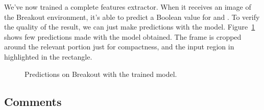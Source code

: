 We've now trained a complete features extractor. When it receives an image of
the Breakout environment, it's able to predict a Boolean value for
 and . To verify the quality of the result, we can
just make predictions with the model. Figure~\ref{fig:breakout-predict} shows
few predictions made with the model obtained. The frame is cropped around the
relevant portion just for compactness, and the input region in highlighted in
the rectangle.
\begin{figure}
	\centering
	\caption{Predictions on Breakout with the trained model.}
	\label{fig:breakout-predict}
\end{figure}





\subsection{Comments}


